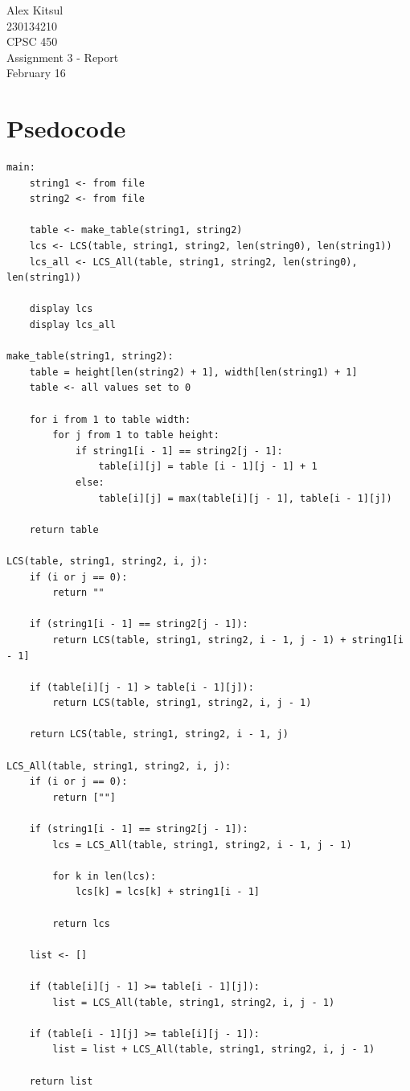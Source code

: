 \documentclass{article}
\begin{document}
\thispagestyle{empty}
\begin{center}
\vspace*{\fill}
\Huge Alex Kitsul\\
\Huge 230134210\\
\Huge CPSC 450\\
\Huge Assignment 3 - Report\\
\Huge February 16\\
\vspace*{\fill}
\end{center}
\pagebreak

\section*{Psedocode}
\begin{lstlisting}
main:
	string1 <- from file
	string2 <- from file
	
	table <- make_table(string1, string2)
	lcs <- LCS(table, string1, string2, len(string0), len(string1))
	lcs_all <- LCS_All(table, string1, string2, len(string0), len(string1))
	
	display lcs
	display lcs_all
	
make_table(string1, string2):
	table = height[len(string2) + 1], width[len(string1) + 1]
	table <- all values set to 0
	
	for i from 1 to table width:
		for j from 1 to table height:
			if string1[i - 1] == string2[j - 1]:
				table[i][j] = table [i - 1][j - 1] + 1
			else:
				table[i][j] = max(table[i][j - 1], table[i - 1][j])
				
	return table
			
LCS(table, string1, string2, i, j):
	if (i or j == 0):
		return ""
		
	if (string1[i - 1] == string2[j - 1]):
		return LCS(table, string1, string2, i - 1, j - 1) + string1[i - 1]
		
	if (table[i][j - 1] > table[i - 1][j]):
		return LCS(table, string1, string2, i, j - 1)
		
	return LCS(table, string1, string2, i - 1, j)
	
LCS_All(table, string1, string2, i, j):
	if (i or j == 0):
		return [""]
		
	if (string1[i - 1] == string2[j - 1]):
		lcs = LCS_All(table, string1, string2, i - 1, j - 1)
		
		for k in len(lcs):
			lcs[k] = lcs[k] + string1[i - 1]
			
		return lcs
		
	list <- []
		
	if (table[i][j - 1] >= table[i - 1][j]):
		list = LCS_All(table, string1, string2, i, j - 1)
		
	if (table[i - 1][j] >= table[i][j - 1]):
		list = list + LCS_All(table, string1, string2, i, j - 1)
		
	return list
		
\end{lstlisting}
\end{document}
